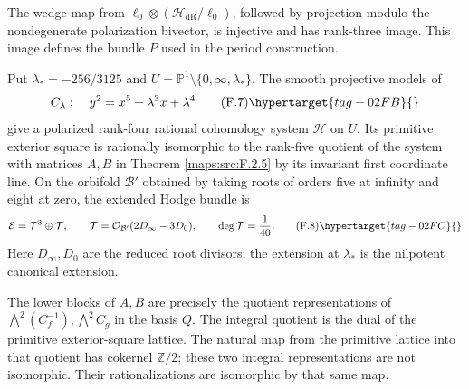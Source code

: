\begin{theorem}\hypertarget{tag-02QW}{}\label{night:P1.5}
The wedge map from
$\ell_0\otimes(\mathcal H_{\mathrm{dR}}/\ell_0)$, followed by
projection modulo the nondegenerate polarization bivector, is
injective and has rank-three image. This image defines the bundle
$P$ used in the period construction.
\end{theorem}

\begin{theorem}\hypertarget{tag-02O7}{}\label{maps:src:F.3.5}


Put $\lambda_*=-256/3125$ and
$U=\mathbb P^1\setminus\{0,\infty,\lambda_*\}$.  The smooth projective
models of
\[
 C_\lambda:\quad y^2=x^5+\lambda^3x+\lambda^4
 \tag{F.7}\hypertarget{tag-02FB}{}\label{maps:eq:F.7}
\]
give a polarized rank-four rational cohomology system $\mathcal H$ on
$U$.  Its primitive exterior square is rationally isomorphic to
the rank-five quotient of the system with matrices $A,B$ in
Theorem \ref{maps:src:F.2.5} by its invariant first coordinate line.
On the orbifold $\mathcal B'$ obtained by taking roots of orders
five at infinity and eight at zero, the extended Hodge bundle is
\[
 \mathcal E=\mathcal T^3\oplus\mathcal T,\qquad
 \mathcal T=\mathcal O_{\mathcal B'}(2D_\infty-3D_0),\qquad
 \deg\mathcal T=\frac1{40}.
 \tag{F.8}\hypertarget{tag-02FC}{}\label{maps:eq:F.8}
\]
Here $D_\infty,D_0$ are the reduced root divisors; the extension at
$\lambda_*$ is the nilpotent canonical extension.

\end{theorem}

\begin{theorem}\hypertarget{tag-02QT}{}\label{night:P1.2}
The lower blocks of $A,B$ are precisely the quotient representations of
$\bigwedge^2(C_f^{-1}),\bigwedge^2C_g$ in the basis $Q$.
The integral quotient is the dual of the primitive exterior-square
lattice.  The natural map from the primitive lattice into that quotient
has cokernel $\mathbb Z/2$; these two integral representations are not
isomorphic.  Their rationalizations are isomorphic by that same map.
\end{theorem}

